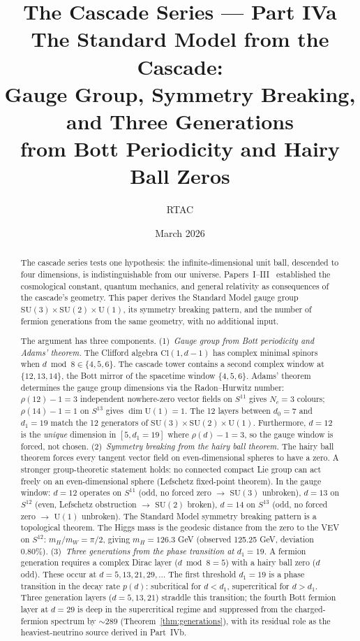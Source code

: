 \documentclass[12pt,a4paper]{article}
\title{The Cascade Series --- Part IVa\\[0.5em]
\large The Standard Model from the Cascade:\\
Gauge Group, Symmetry Breaking, and Three Generations\\
from Bott Periodicity and Hairy Ball Zeros}
\author{RTAC}
\date{March 2026}
\begin{document}
\setlength{\emergencystretch}{3em}
\maketitle
{}
\label{paperdoc}

\begin{abstract}
The cascade series tests one hypothesis: the infinite-dimensional unit ball, descended to
four dimensions, is indistinguishable from our universe. Papers~I--III~\cite{part0,part2,part3}
established the cosmological constant, quantum mechanics, and general relativity as
consequences of the cascade's geometry. This paper derives the Standard Model gauge group
$\mathrm{SU}(3)\times\mathrm{SU}(2)\times\mathrm{U}(1)$, its symmetry breaking pattern,
and the number of fermion generations from the same geometry, with no additional input.

The argument has three components. (1)~\emph{Gauge group from Bott periodicity and Adams'
theorem.} The Clifford algebra $\mathrm{Cl}(1,d-1)$ has complex minimal spinors when
$d\bmod 8\in\{4,5,6\}$. The cascade tower contains a second complex window at $\{12,13,14\}$,
the Bott mirror of the spacetime window $\{4,5,6\}$. Adams' theorem determines the gauge
group dimensions via the Radon--Hurwitz number: $\rho(12)-1=3$ independent nowhere-zero
vector fields on $S^{11}$ gives $N_c=3$ colours; $\rho(14)-1=1$ on $S^{13}$ gives
$\dim\mathrm{U}(1)=1$. The 12 layers between $d_0=7$ and $d_1=19$ match the 12 generators
of $\mathrm{SU}(3)\times\mathrm{SU}(2)\times\mathrm{U}(1)$. Furthermore, $d=12$ is the
\emph{unique} dimension in $[5,d_1=19]$ where $\rho(d)-1=3$, so the gauge window is
forced, not chosen. (2)~\emph{Symmetry breaking from the hairy ball theorem.} The hairy
ball theorem forces every tangent vector field on even-dimensional spheres to have a zero.
A stronger group-theoretic statement holds: no connected compact Lie group can act freely
on an even-dimensional sphere (Lefschetz fixed-point theorem). In the gauge window:
$d=12$ operates on $S^{11}$ (odd, no forced zero $\to$ $\mathrm{SU}(3)$ unbroken), $d=13$
on $S^{12}$ (even, Lefschetz obstruction $\to$ $\mathrm{SU}(2)$ broken), $d=14$ on
$S^{13}$ (odd, no forced zero $\to$ $\mathrm{U}(1)$ unbroken). The Standard Model
symmetry breaking pattern is a topological theorem. The Higgs mass is the geodesic
distance from the zero to the VEV on $S^{12}$: $m_H/m_W=\pi/2$, giving $m_H=126.3$ GeV
(observed 125.25 GeV, deviation 0.80\%). (3)~\emph{Three generations from the phase
transition at $d_1=19$.} A fermion generation requires a complex Dirac layer ($d\bmod 8=5$)
with a hairy ball zero ($d$ odd). These occur at $d=5,13,21,29,\ldots$ The first threshold
$d_1=19$ is a phase transition in the decay rate $p(d)$: subcritical for $d<d_1$,
supercritical for $d>d_1$. Three generation layers ($d=5,13,21$) straddle this transition;
the fourth Bott fermion layer at $d=29$ is deep in the supercritical regime and suppressed
from the charged-fermion spectrum by $\sim 289$ (Theorem~\ref{thm:generations}), with its
residual role as the heaviest-neutrino source derived in Part~IVb.


\end{abstract}
\end{document}

